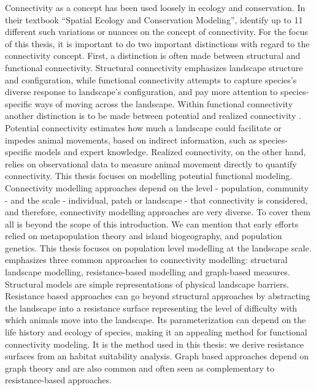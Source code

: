 \documentclass[12pt,Bold,TexShade]{thesis/mcgilletdclass}
\begin{document}
{Connectivity as a concept has been used loosely in ecology and conservation. In their textbook “Spatial Ecology and Conservation Modeling”, \cite{fletcher_spatial_2018} identify up to 11 different such variations or nuances on the concept of connectivity. For the focus of this thesis, it is important to do two important distinctions with regard to the connectivity concept. First, a distinction is often made between structural and functional connectivity. Structural connectivity emphasizes landscape structure and configuration, while functional connectivity attempts to capture species’s diverse response to landscape’s configuration, and pay more attention to species-specific ways of moving across the landscape. Within functional connectivity another distinction is to be made between potential and realized connectivity \citep{calabrese_comparison_2004}. Potential connectivity estimates how much a landscape could facilitate or impedes animal movements, based on indirect information, such as species-specific models and expert knowledge. Realized connectivity, on the other hand, relies on observational data to measure animal movement directly to quantify connectivity. This thesis focuses on modelling potential functional modeling. \\

Connectivity modelling approaches depend on the level - population, community - and the scale - individual, patch or  landscape - that connectivity is considered, and therefore, connectivity modelling approaches are very diverse. To cover them all is beyond the scope of this introduction. We can mention that early efforts relied on metapopulation theory and island biogeography, and population genetics. This thesis focuses on population level modelling at the landscape scale. \\

\cite{fletcher_spatial_2018} emphasizes three common approaches to connectivity modelling: structural landscape modelling, resistance-based modelling and graph-based measures. Structural models are simple representations of physical landscape barriers. Resistance based approaches can go beyond structural approaches by abstracting the landscape into a resistance surface representing the level of difficulty with which animals move into the landscape. Its parameterization can depend on the life history and ecology of species, making it an appealing method for functional connectivity modeling.  It is the method used in this thesis: we derive resistance surfaces from an habitat suitability analysis. Graph based approaches depend on graph theory and are also common and often seen as complementary to resistance-based approaches. \\

}
\end{document}

